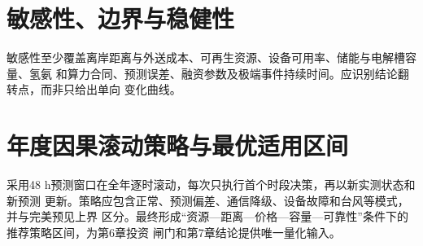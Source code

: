 
\section{敏感性、边界与稳健性}

敏感性至少覆盖离岸距离与外送成本、可再生资源、设备可用率、储能与电解槽容量、氢氨
和算力合同、预测误差、融资参数及极端事件持续时间。应识别结论翻转点，而非只给出单向
变化曲线。


\section{年度因果滚动策略与最优适用区间}

采用48 h预测窗口在全年逐时滚动，每次只执行首个时段决策，再以新实测状态和新预测
更新。策略应包含正常、预测偏差、通信降级、设备故障和台风等模式，并与完美预见上界
区分。最终形成“资源—距离—价格—容量—可靠性”条件下的推荐策略区间，为第6章投资
闸门和第7章结论提供唯一量化输入。



